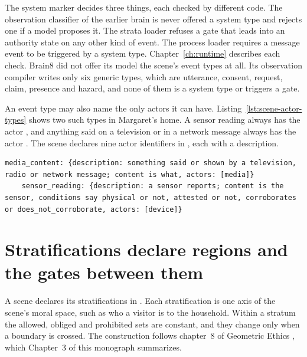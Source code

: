 The system marker decides three things, each checked by different code. The observation classifier
of the earlier brain is never offered a system type and rejects one if a model proposes it. The
strata loader refuses a gate that leads into an authority state on any other kind of event. The
process loader requires a message event to be triggered by a system type.
Chapter~\ref{ch:runtime} describes each check. Brain8 did not offer its model the
scene's event types at all. Its observation compiler writes only six generic types, which are
utterance, consent, request, claim, presence and hazard, and none of them is a system type or
triggers a gate.

An event type may also name the only actors it can have. Listing~\ref{lst:scene-actor-types} shows
two such types in Margaret's home. A sensor reading always has the actor , and anything
said on a television or in a network message always has the actor . The scene declares
nine actor identifiers in , each with a description.

\begin{lstlisting}[caption={Two event types that fix their actor (lines 1327 to 1328)}, label={lst:scene-actor-types}]
    media_content: {description: something said or shown by a television, radio or network message; content is what, actors: [media]}
    sensor_reading: {description: a sensor reports; content is the sensor, conditions say physical or not, attested or not, corroborates or does_not_corroborate, actors: [device]}
\end{lstlisting}

\section{Stratifications declare regions and the gates between them}\label{sec:erisml-strata}

A scene declares its stratifications in . Each stratification is one axis of the
scene's moral space, such as who a visitor is to the household. Within a stratum the allowed, obliged
and prohibited sets are constant, and they change only when a boundary is crossed. The construction
follows chapter~8 of Geometric Ethics \cite{bond2026geometricethics}, which Chapter~3 of this monograph
summarizes.

